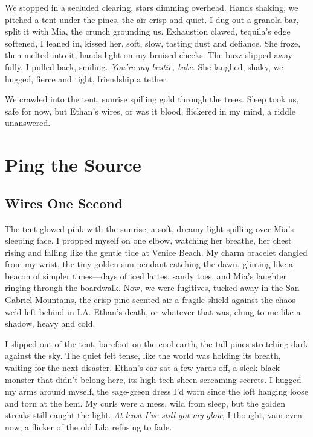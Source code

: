 \documentclass[12pt,oneside]{book}
\begin{document}
We stopped in a secluded clearing, stars dimming overhead. Hands shaking, we pitched a tent under the pines, the air crisp and quiet. I dug out a granola bar, split it with Mia, the crunch grounding us. Exhaustion clawed, tequila’s edge softened, I leaned in, kissed her, soft, slow, tasting dust and defiance. She froze, then melted into it, hands light on my bruised cheeks. The buzz slipped away fully, I pulled back, smiling. \textit{You’re my bestie, babe}. She laughed, shaky, we hugged, fierce and tight, friendship a tether.

We crawled into the tent, sunrise spilling gold through the trees. Sleep took us, safe for now, but Ethan’s wires, or was it blood, flickered in my mind, a riddle unanswered.

\part{Ping the Source}

\chapter{Wires One Second}

The tent glowed pink with the sunrise, a soft, dreamy light spilling over Mia's sleeping face. I propped myself on one elbow, watching her breathe, her chest rising and falling like the gentle tide at Venice Beach. My charm bracelet dangled from my wrist, the tiny golden sun pendant catching the dawn, glinting like a beacon of simpler times—days of iced lattes, sandy toes, and Mia's laughter ringing through the boardwalk. Now, we were fugitives, tucked away in the San Gabriel Mountains, the crisp pine-scented air a fragile shield against the chaos we'd left behind in LA. Ethan's death, or whatever that was, clung to me like a shadow, heavy and cold.

I slipped out of the tent, barefoot on the cool earth, the tall pines stretching dark against the sky. The quiet felt tense, like the world was holding its breath, waiting for the next disaster. Ethan's car sat a few yards off, a sleek black monster that didn’t belong here, its high-tech sheen screaming secrets. I hugged my arms around myself, the sage-green dress I’d worn since the loft hanging loose and torn at the hem. My curls were a mess, wild from sleep, but the golden streaks still caught the light. \textit{At least I’ve still got my glow}, I thought, vain even now, a flicker of the old Lila refusing to fade.
\end{document}
